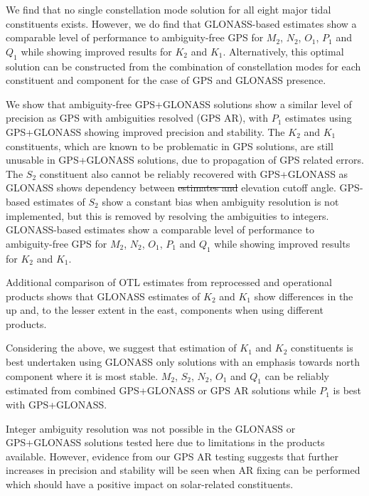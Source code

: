 \documentclass[se, manuscript]{copernicus}
\providecommand{\DIFadd}[1]{{\protect\color{blue}\uwave{#1}}} %
\providecommand{\DIFdel}[1]{{\protect\color{red}\sout{#1}}}                      %
\providecommand{\DIFaddbegin}{} %
\providecommand{\DIFaddend}{} %
\providecommand{\DIFdelbegin}{} %
\providecommand{\DIFdelend}{} %
\begin{document}
We find that no single constellation mode solution for all eight major tidal constituents exists. However, we do find that GLONASS-based estimates show a comparable level of performance to ambiguity-free GPS for $M_2$, $N_2$, $O_1$, $P_1$ and $Q_1$ while showing improved results for $K_2$ and $K_1$. Alternatively, this optimal solution can be constructed from the combination of constellation modes for each constituent and component for the case of GPS and GLONASS presence.

We show that ambiguity-free GPS+GLONASS solutions show a similar level of precision as GPS with ambiguities resolved (GPS AR), with $P_1$ estimates using GPS+GLONASS showing improved precision and stability. The $K_2$ and $K_1$ constituents, which are known to be problematic in GPS solutions, are still unusable in GPS+GLONASS solutions, due to propagation of GPS related errors. The $S_2$ constituent also cannot be reliably recovered with GPS+GLONASS as GLONASS shows dependency between \DIFdelbegin \DIFdel{estimates and }\DIFdelend \DIFaddbegin \DIFadd{the estimates and chosen }\DIFaddend elevation cutoff angle. GPS-based estimates of $S_2$ show a constant bias when ambiguity resolution is not implemented, but this is removed by resolving the ambiguities to integers. GLONASS-based estimates show a comparable level of performance to ambiguity-free GPS for $M_2$, $N_2$, $O_1$, $P_1$ and $Q_1$ while showing improved results for $K_2$ and $K_1$.

Additional comparison of OTL estimates from reprocessed and operational products shows that GLONASS estimates of $K_2$ and $K_1$ show differences in the up and, to the lesser extent in the east, components when using different products.

Considering the above, we suggest that estimation of $K_1$ and $K_2$ constituents is best undertaken using GLONASS only solutions with an emphasis towards \DIFaddbegin \DIFadd{the }\DIFaddend north component where it is most stable. $M_2$, $S_2$, $N_2$, $O_1$ and $Q_1$ can be reliably estimated from combined GPS+GLONASS or GPS AR solutions while $P_1$ is best with GPS+GLONASS.

Integer ambiguity resolution was not possible in the GLONASS or GPS+GLONASS solutions tested here due to limitations in the products available. However, evidence from our GPS AR testing suggests that further increases in precision and stability will be seen when AR fixing can be performed which should have a positive impact on solar-related constituents.
\end{document}
